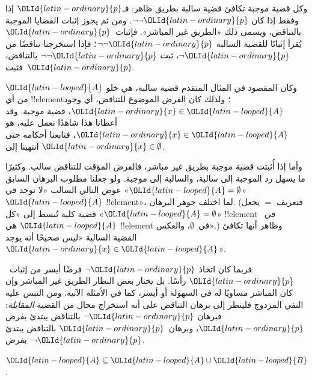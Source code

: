 \documentclass[../../../include/open-logic-section]{subfiles}
\begin{document}
وكل قضية موجبة تكافئ قضية سالبة بطريق ظاهر: فـ${\OLId{latin-ordinary}{p}}$ إذا وفقط إذا كان
$\lnot\lnot {\OLId{latin-ordinary}{p}}$. ومن ثم يجوز إثبات القضايا الموجبة بالتناقض، ويسمى
ذلك «الطريق غير المباشر». فإثبات~${\OLId{latin-ordinary}{p}}$ يُقرأ إثباتًا للقضية السالبة
$\lnot\lnot {\OLId{latin-ordinary}{p}}$؛ فإذا استخرجنا تناقضًا من $\lnot {\OLId{latin-ordinary}{p}}$، ثبت
$\lnot\lnot {\OLId{latin-ordinary}{p}}$ بالتناقض، فثبت~${\OLId{latin-ordinary}{p}}$.

وكان المقصود في المثال المتقدم قضية سالبة، هي خلو ${\OLId{latin-looped}{A}}$ من أي
!!{element}؛ ولذلك كان الفرض الموضوع للتناقض، أي وجود ${\OLId{latin-ordinary}{x}} \in {\OLId{latin-looped}{A}}$،
قضية موجبة. وقد أعطانا هذا شاهدًا نعمل عليه، هو ${\OLId{latin-ordinary}{x}} \in {\OLId{latin-looped}{A}}$، فتابعنا
أحكامه حتى انتهينا إلى ${\OLId{latin-ordinary}{x}} \in \emptyset$.

وأما إذا أُثبتت قضية موجبة بطريق غير مباشر، فالفرض المؤقت للتناقض
سالب. وكثيرًا ما يسهل رد الموجبة إلى سالبة، والسالبة إلى موجبة. ولو
جعلنا مطلوب البرهان السابق «${\OLId{latin-looped}{A}} = \emptyset$» عوض التالي السالب «لا
توجد في ${\OLId{latin-looped}{A}}$ !!{element}»، لما اختلف جوهر البرهان. (فتعريف $=$ يجعل
«${\OLId{latin-looped}{A}} = \emptyset$» قضية كلية تُبسط إلى «كل !!{element} في~${\OLId{latin-looped}{A}}$ هي
!!{element} في~$\emptyset$، والعكس».) وظاهر أنها تكافئ القضية السالبة
«ليس صحيحًا أنه يوجد ${\OLId{latin-ordinary}{x}} \in {\OLId{latin-looped}{A}}$».

فربما كان اتخاذ $\lnot {\OLId{latin-ordinary}{p}}$ فرضًا أيسر من إثبات~${\OLId{latin-ordinary}{p}}$ رأسًا. بل يختار
بعض النظار الطريق غير المباشر وإن كان المباشر مساويًا له في السهولة
أو أيسر، كما في الأمثلة الآتية. ومن التبس عليه النفي المزدوج فلينظر
إلى برهان التناقض على أنه استخراج محال من القضية \emph{المقابلة}:
فبرهان $\lnot {\OLId{latin-ordinary}{p}}$ بالتناقض يبتدئ بفرض ${\OLId{latin-ordinary}{p}}$، وبرهان~${\OLId{latin-ordinary}{p}}$ بالتناقض يبتدئ
بفرض~$\lnot {\OLId{latin-ordinary}{p}}$.

\begin{prop}
${\OLId{latin-looped}{A}} \subseteq {\OLId{latin-looped}{A}} \cup {\OLId{latin-looped}{B}}$.
\end{prop}
\end{document}
